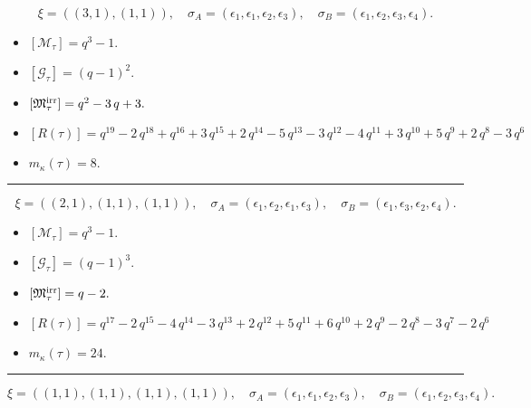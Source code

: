 \documentclass[10pt,a4paper]{amsart}
\begin{document}
$$\xi = ({(3, 1)}, {(1, 1)}),\quad \sigma_A = ({{\epsilon_1, \epsilon_1, \epsilon_2}}, {{\epsilon_3}}),\quad \sigma_B = ({{\epsilon_1, \epsilon_2, \epsilon_3}}, {{\epsilon_4}}).$$

\begin{itemize}
 \item $[\mathcal{M}_{\tau}] = q^{3} - 1 .$

 \item $[\mathcal{G}_{\tau}] = {\left(q - 1\right)}^{2} .$

 \item $[{\frak M}_{\tau}^{\textrm{irr}}] = q^{2} - 3 \, q + 3 .$

 \item $[R(\tau)] = q^{19} - 2 \, q^{18} + q^{16} + 3 \, q^{15} + 2 \, q^{14} - 5 \, q^{13} - 3 \, q^{12} - 4 \, q^{11} + 3 \, q^{10} + 5 \, q^{9} + 2 \, q^{8} - 3 \, q^{6} $

 \item $m_{\kappa}(\tau) = 8 .$

 \end{itemize}
\noindent\rule{8cm}{0.4pt}

$$\xi = ({(2, 1), (1, 1)}, {(1, 1)}),\quad \sigma_A = ({{\epsilon_1, \epsilon_2}, {\epsilon_1}}, {{\epsilon_3}}),\quad \sigma_B = ({{\epsilon_1, \epsilon_3}, {\epsilon_2}}, {{\epsilon_4}}).$$

\begin{itemize}
 \item $[\mathcal{M}_{\tau}] = q^{3} - 1 .$

 \item $[\mathcal{G}_{\tau}] = {\left(q - 1\right)}^{3} .$

 \item $[{\frak M}_{\tau}^{\textrm{irr}}] = q - 2 .$

 \item $[R(\tau)] = q^{17} - 2 \, q^{15} - 4 \, q^{14} - 3 \, q^{13} + 2 \, q^{12} + 5 \, q^{11} + 6 \, q^{10} + 2 \, q^{9} - 2 \, q^{8} - 3 \, q^{7} - 2 \, q^{6} $

 \item $m_{\kappa}(\tau) = 24 .$

 \end{itemize}
\noindent\rule{8cm}{0.4pt}

$$\xi = ({(1, 1), (1, 1), (1, 1)}, {(1, 1)}),\quad \sigma_A = ({{\epsilon_1}, {\epsilon_1}, {\epsilon_2}}, {{\epsilon_3}}),\quad \sigma_B = ({{\epsilon_1}, {\epsilon_2}, {\epsilon_3}}, {{\epsilon_4}}).$$
\end{document}
